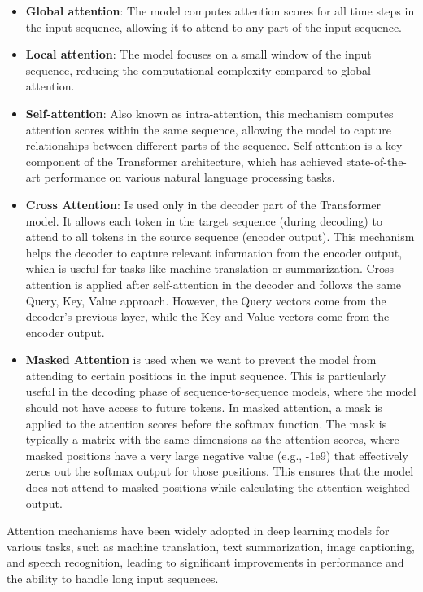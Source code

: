 \documentclass[12pt]{article}
\begin{document}
\begin{itemize}
\item \textbf{Global attention}: The model computes attention scores for all time steps in the input sequence, allowing it to attend to any part of the input sequence.
\item \textbf{Local attention}: The model focuses on a small window of the input sequence, reducing the computational complexity compared to global attention.
\item \textbf{Self-attention}: Also known as intra-attention, this mechanism computes attention scores within the same sequence, allowing the model to capture relationships between different parts of the sequence. Self-attention is a key component of the Transformer architecture, which has achieved state-of-the-art performance on various natural language processing tasks.
\item \textbf{Cross Attention}: Is used only in the decoder part of the Transformer model. It allows each token in the target sequence (during decoding) to attend to all tokens in the source sequence (encoder output). This mechanism helps the decoder to capture relevant information from the encoder output, which is useful for tasks like machine translation or summarization. Cross-attention is applied after self-attention in the decoder and follows the same Query, Key, Value approach. However, the Query vectors come from the decoder's previous layer, while the Key and Value vectors come from the encoder output.
\item \textbf{Masked Attention} is used when we want to prevent the model from attending to certain positions in the input sequence. This is particularly useful in the decoding phase of sequence-to-sequence models, where the model should not have access to future tokens. In masked attention, a mask is applied to the attention scores before the softmax function. The mask is typically a matrix with the same dimensions as the attention scores, where masked positions have a very large negative value (e.g., -1e9) that effectively zeros out the softmax output for those positions. This ensures that the model does not attend to masked positions while calculating the attention-weighted output.
\end{itemize}
Attention mechanisms have been widely adopted in deep learning models for various tasks, such as machine translation, text summarization, image captioning, and speech recognition, leading to significant improvements in performance and the ability to handle long input sequences.
\end{document}
